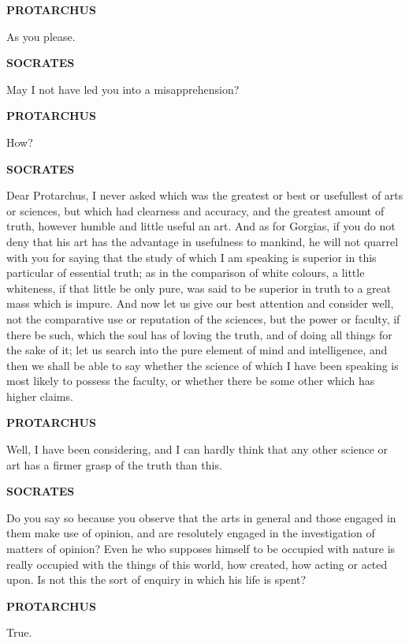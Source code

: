 \documentclass[11pt,letter]{article}
\begin{document}
\par \textbf{PROTARCHUS}
\par   As you please.

\par \textbf{SOCRATES}
\par   May I not have led you into a misapprehension?

\par \textbf{PROTARCHUS}
\par   How?

\par \textbf{SOCRATES}
\par   Dear Protarchus, I never asked which was the greatest or best or usefullest of arts or sciences, but which had clearness and accuracy, and the greatest amount of truth, however humble and little useful an art. And as for Gorgias, if you do not deny that his art has the advantage in usefulness to mankind, he will not quarrel with you for saying that the study of which I am speaking is superior in this particular of essential truth; as in the comparison of white colours, a little whiteness, if that little be only pure, was said to be superior in truth to a great mass which is impure. And now let us give our best attention and consider well, not the comparative use or reputation of the sciences, but the power or faculty, if there be such, which the soul has of loving the truth, and of doing all things for the sake of it; let us search into the pure element of mind and intelligence, and then we shall be able to say whether the science of which I have been speaking is most likely to possess the faculty, or whether there be some other which has higher claims.

\par \textbf{PROTARCHUS}
\par   Well, I have been considering, and I can hardly think that any other science or art has a firmer grasp of the truth than this.

\par \textbf{SOCRATES}
\par   Do you say so because you observe that the arts in general and those engaged in them make use of opinion, and are resolutely engaged in the investigation of matters of opinion? Even he who supposes himself to be occupied with nature is really occupied with the things of this world, how created, how acting or acted upon. Is not this the sort of enquiry in which his life is spent?

\par \textbf{PROTARCHUS}
\par   True.
\end{document}

